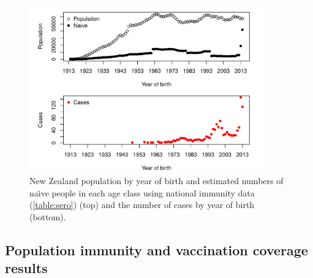 \documentclass{article}
\begin{document}
\begin{figure}
\begin{center}
     \includegraphics[width=0.9\textwidth]{naive_allPop_yob.pdf}
\end{center}
\caption{New Zealand population by year of birth and estimated numbers of na\"{\i}ve people in each age class using national immunity data (\autoref{table:sero}) (top) and the number of cases by year of birth (bottom).}
\label{fig:naive_yob}
\end{figure}

\subsection{Population immunity and vaccination coverage results}
\label{sub:popim}
\end{document}
